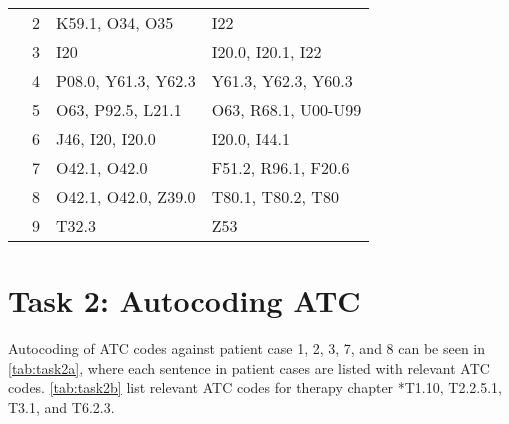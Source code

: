 \begin{table}[htbp]
\begin{tabular}{c c l l}
	 & 2 & K59.1, O34, O35 & I22 \\
	 & 3 & I20 & I20.0, I20.1, I22 \\
	 & 4 & P08.0, Y61.3, Y62.3 & Y61.3, Y62.3, Y60.3 \\
	 & 5 & O63, P92.5, L21.1 & O63, R68.1, U00-U99 \\
	 & 6 & J46, I20, I20.0 & I20.0, I44.1 \\
	 & 7 & O42.1, O42.0 & F51.2, R96.1, F20.6 \\
	 & 8 & O42.1, O42.0, Z39.0 & T80.1, T80.2, T80 \\
	 & 9 & T32.3 & Z53 \\
	\bottomrule
\end{tabular}
\end{table}


\section{Task 2: Autocoding ATC}
Autocoding of ATC codes against patient case 1, 2, 3, 7, and 8 can be seen in
\autoref{tab:task2a}, where each sentence in patient cases are listed with
relevant ATC codes. \autoref{tab:task2b} list relevant ATC codes for therapy
chapter *T1.10, T2.2.5.1, T3.1, and T6.2.3.
